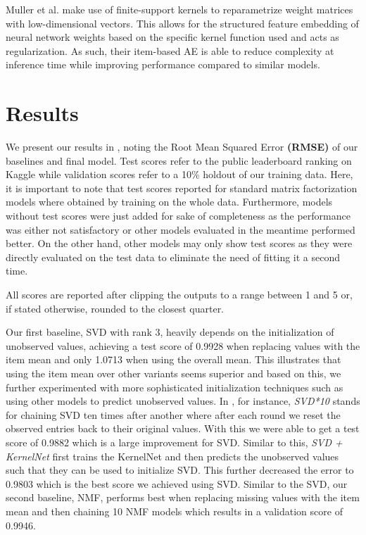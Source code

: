 \documentclass[10pt,conference,compsocconf]{IEEEtran}
\begin{document}
    Muller et al. make use of finite-support kernels to reparametrize weight matrices with low-dimensional vectors.
    This allows for the structured feature embedding of neural network weights based on the specific kernel function used and
    acts as regularization.
    As such, their item-based AE is able to reduce complexity at inference time while improving performance compared to similar models\cite{pmlr-v80-muller18a}.


    \section{Results}
    We present our results in , noting the Root Mean Squared Error \textbf{(RMSE)} of our baselines and final model.
    Test scores refer to the public leaderboard ranking on Kaggle while validation scores refer to a 10\% holdout of our training data.
    Here, it is important to note that test scores reported for standard matrix factorization models where obtained by training on the whole data.
    Furthermore, models without test scores were just added for sake of completeness as the performance was either not satisfactory or other models evaluated in the meantime performed better.
    On the other hand, other models may only show test scores as they were directly evaluated on the test data to eliminate the need of
    fitting it a second time.

    All scores are reported after clipping the outputs to a range between 1 and 5 or, if stated otherwise, rounded to the closest quarter.

    Our first baseline, SVD with rank 3, heavily depends on the initialization of unobserved values, achieving a test score of 0.9928 when replacing values with the item mean and only 1.0713 when using the overall mean.
    This illustrates that using the item mean over other variants seems superior and based on this, we further experimented with more sophisticated initialization techniques such as using other models to predict unobserved values.
    In , for instance, \textit{SVD*10} stands for chaining SVD ten times after another where after each round we reset the observed entries back to their original values.
    With this we were able to get a test score of 0.9882 which is a large improvement for SVD.
    Similar to this, \textit{SVD + KernelNet} first trains the KernelNet and then predicts the unobserved values such that they can be used to initialize SVD.
    This further decreased the error to 0.9803 which is the best score we achieved using SVD.
    Similar to the SVD, our second baseline, NMF, performs best when replacing missing values with the item mean and then chaining 10 NMF models which results in a validation score of 0.9946.
\end{document}
